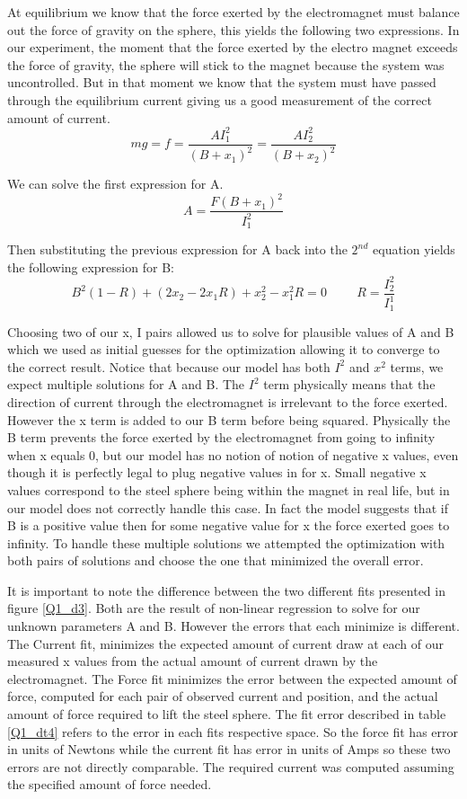 \documentclass{article}
\theoremstyle{plain}
\theoremstyle{definition}
\theoremstyle{remark}
\begin{document}
At equilibrium we know that the force exerted by the electromagnet must balance out the force of gravity on the sphere, this yields the following two expressions.  In our experiment, the moment that the force exerted by the electro magnet exceeds the force of gravity, the sphere will stick to the magnet because the system was uncontrolled.  But in that moment we know that the system must have passed through the equilibrium current giving us a good measurement of the correct amount of current.
$$ mg = f = \frac{A I_{1}^2}{(B+x_{1})^2}  = \frac{A I_{2}^2}{(B+x_{2})^2} $$ 

We can solve the first expression for A.
$$ A = \frac{F (B + x_{1})^2}{I_{1}^2}$$

Then substituting the previous expression for A back into the $2^{nd}$ equation yields the following expression for B:
$$ B^2(1-R) + (2x_2-2x_1R)+x_2^2-x_1^2R = 0 \hspace{1cm} R = \frac{I_2^2}{I_1^1} $$

Choosing two of our x, I pairs allowed us to solve for plausible values of A and B which we used as initial guesses for the optimization allowing it to converge to the correct result.  Notice that because our model has both $I^2$ and $x^2$ terms, we expect multiple solutions for A and B.  The $I^2$ term physically means that the direction of current through the electromagnet is irrelevant to the force exerted.  However the x term is added to our B term before being squared.  Physically the B term prevents the force exerted by the electromagnet from going to infinity when x equals 0, but our model has no notion of notion of negative x values, even though it is perfectly legal to plug negative values in for x.  Small negative x values correspond to the steel sphere being within the magnet in real life, but in our model does not correctly handle this case.  In fact the model suggests that if B is a positive value then for some negative value for x the force exerted goes to infinity.  To handle these multiple solutions we attempted the optimization with both pairs of solutions and choose the one that minimized the overall error.  

 It is important to note the difference between the two different fits presented in figure \ref{Q1_d3}.  Both are the result of non-linear regression to solve for our unknown parameters A and B.  However the errors that each minimize is different.  The Current fit, minimizes the expected amount of current draw at each of our measured x values from the actual amount of current drawn by the electromagnet.  The Force fit minimizes the error between the expected amount of force, computed for each pair of observed current and position, and the actual amount of force required to lift the steel sphere.  The fit error described in table \ref{Q1_dt4} refers to the error in each fits respective space.  So the force fit has error in units of Newtons while the current fit has error in units of Amps so these two errors are not directly comparable.  The required current was computed assuming the specified amount of force needed.
\end{document}
